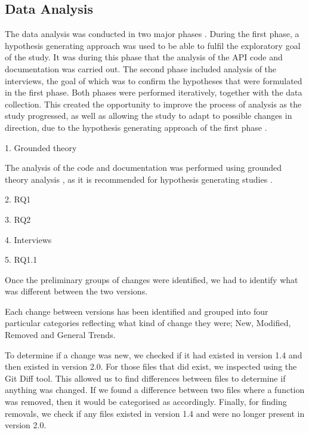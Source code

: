 \documentclass{sig-alternate}
\begin{document}
\subsection{Data Analysis} \label{data_analysis}
The data analysis was conducted in two major phases \cite{andersson2007spiral}. During the first phase, a hypothesis generating approach \cite{seaman1999qualitative} was used to be able to fulfil the exploratory goal of the study. It was during this phase that the analysis of the API code and documentation was carried out. The second phase included analysis of the interviews, the goal of which was to confirm the hypotheses \cite{seaman1999qualitative} that were formulated in the first phase. Both phases were performed iteratively, together with the data collection. This created the opportunity to improve the process of analysis as the study progressed, as well as allowing the study to adapt to possible changes in direction, due to the hypothesis generating approach of the first phase \cite{andersson2007spiral}. 

1. Grounded theory

The analysis of the code and documentation was performed using grounded theory analysis \cite{seaman1999qualitative}, as it is recommended for hypothesis generating studies \cite{runeson2009guidelines} \cite{seaman1999qualitative}.

2. RQ1

3. RQ2

4. Interviews

5. RQ1.1


Once the preliminary groups of changes were identified, we had to identify what was different between the two versions. %

Each change between versions has been identified and grouped into four particular categories reflecting what kind of change they were; New, Modified, Removed and General Trends.

To determine if a change was new, we checked if it had existed in version 1.4 and then existed in version 2.0. For those files that did exist, we inspected using the Git Diff tool. This allowed us to find differences between files to determine if anything was changed. If we found a difference between two files where a function was removed, then it would be categorised as accordingly. Finally, for finding removals, we check if any files existed in version 1.4 and were no longer present in version 2.0.
\end{document}
